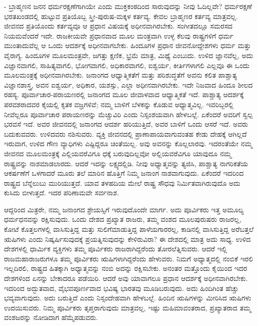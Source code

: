 - ಬ್ರಾಹ್ಮಣನ ಜನನ ಧರ್ಮರಕ್ಷಣೆಗಾಗಿಯೇ ಎಂದು ಮುಕ್ತಕಂಠದಿಂದ ಸಾರುವುದನ್ನು ನೀವು ಓದಿಲ್ಲವೇ? ಧರ್ಮರಕ್ಷಣೆ ಭರತಖಂಡದಲ್ಲಿ ಹುಟ್ಟುವ ಪ್ರತಿಯೊಬ್ಬ ಸ್ತ್ರೀ-ಪುರುಷ-ಮಕ್ಕಳ ಕರ್ತವ್ಯ. ಕೇವಲ ಬ್ರಾಹ್ಮಣರ ಕರ್ತವ್ಯ ಮಾತ್ರವಲ್ಲ. ಜೀವನದ ಪ್ರತಿಯೊಂದು ಕರ್ತವ್ಯವೂ ಆ ಪ್ರಧಾನ ವಿಷಯಕ್ಕೆ ಅಧೀನವಾಗಿರಬೇಕು. ಸಂಗೀತದಲ್ಲೂ ಸಮರಸದ ನಿಯಮವೆಂದರೆ ಇದೇ. ರಾಜಕೀಯವೇ ಪ್ರಧಾನವಾದ ಮೂಲ ಮಂತ್ರವಾಗಿ ಉಳ್ಳ ಕೆಲವು ರಾಷ್ಟ್ರಗಳಿಗೆ ಧರ್ಮ ಮುಂತಾದುವೆಲ್ಲ ಆ ಒಂದು ಆದರ್ಶಕ್ಕೆ ಅಧೀನವಾಗಬೇಕು. ಹಿಂದೂಗಳ ಪ್ರಧಾನ ಜೀವನೋದ್ದೇಶಗಳು ಧರ್ಮ ಮತ್ತು ವೈರಾಗ್ಯ. ಹಿಂದೂಗಳ ಮೂಲಮಂತ್ರವೇ, ಜಗತ್ತು ಕ್ಷಣಿಕ, ಭ್ರಮೆ ಮಾತ್ರ, ಮಿಥ್ಯೆ ಎಂಬುದು. ಉಳಿದ ಜ್ಞಾನವೆಲ್ಲ, ಅದು ವಿಜ್ಞಾನವಾಗಲಿ, ಸಾಹಿತ್ಯವಾಗಲಿ, ಭೋಗವಾಗಲಿ, ಅಧಿಕಾರವಾಗಲಿ, ಐಶ್ವರ್ಯ, ಕೀರ್ತಿಗಳಾಗಲಿ ಎಲ್ಲವೂ ಈ ಒಂದು ಮೂಲಮಂತ್ರಕ್ಕೆ ಅಧೀನವಾಗಿರಬೇಕು. ಜನಾಂಗದ ಆಧ್ಯಾತ್ಮಿಕತೆಗೆ ಮತ್ತು ಪರಿಶುದ್ಧತೆಗೆ ಅವನು ಕಲಿತ ಪಾಶ್ಚಾತ್ಯ ವಿಜ್ಞಾನಶಾಸ್ತ್ರ, ಅವನ ಐಶ್ವರ್ಯ, ಅಧಿಕಾರ, ಯಶಸ್ಸು, ಎಲ್ಲಾ ಅಧೀನವಾಗಿರಬೇಕು. ಇದೇ ನಿಜವಾದ ಹಿಂದೂ ಶೀಲದ ರಹಸ್ಯ. ಪೂರ್ವಾಚಾರ-ಪರಾಯಣರಲ್ಲಿ ಜನಾಂಗದ ಮೂಲ ಜೀವಾಳವಾದ ಆಧ್ಯಾತ್ಮಿಕತೆ ಇದೆ. ಪಾಶ್ಚಾತ್ಯ ಆದರ್ಶಕ್ಕೆ ಪರವಶರಾದವರ ಕೈಯಲ್ಲಿ ಕೃತಕ ವಜ್ರಗಳಿವೆ; ನಮ್ಮ ಬಾಳಿಗೆ ಬೆಳಕನ್ನು ಕೊಡುವ ಅಧ್ಯಾತ್ಮವಿಲ್ಲ. ಇವರಿಬ್ಬರಲ್ಲಿ ನೀವೆಲ್ಲರೂ ಪೂರ್ವಾಚಾರ ಪರಾಯಣರನ್ನು ಮೆಚ್ಚುವಿರಿ ಎಂದು ನಿಸ್ಸಂಶಯವಾಗಿ ಹೇಳಬಲ್ಲೆ. ಏಕೆಂದರೆ ಅವರಿಗೆ ಸ್ವಲ್ಪ ಭರವಸೆ ಇದೆ. ಅವರ ಜೀವನದಲ್ಲಿ ಜನಾಂಗದ ಆದರ್ಶ ಹರಿಯುತ್ತಿದೆ, ಅವರ ಬಾಳಿಗೆ ಒಂದು ಆಸರೆ ಇದೆ. ಅವರು ಬದುಕುವವರು. ಉಳಿದವರು ನಶಿಸುವರು. ವ್ಯಕ್ತಿ ಜೀವನದಲ್ಲಿ ಪ್ರಾಣಾಪಾಯವಾಗುವಂತಹ ಕೇಡು ದೇಹಕ್ಕೆ ಆಗಿಲ್ಲದೆ ಇರುವಾಗ, ಉಳಿದ ಗೌಣ ವ್ಯಾಧಿಗಳು ಎಷ್ಟಿದ್ದರೂ ಚಿಂತೆಯಿಲ್ಲ. ಅವು ಅವನನ್ನು ಕೊಲ್ಲಲಾರವು. ಇದರಂತೆಯೇ ನಮ್ಮ ಜೀವನದ ಮೂಲಮಂತ್ರಕ್ಕೆ ಎಲ್ಲಿಯವರೆವಿಗೂ ಧಕ್ಕೆ ಬರುವುದಿಲ್ಲವೋ ಅಲ್ಲಿಯವರೆವಿಗೂ ಯಾವುದೂ ನಮ್ಮ ರಾಷ್ಟ್ರವನ್ನು ನಾಶಮಾಡಲಾರದು. ಆದರೆ ಇದನ್ನು ಲಕ್ಷ್ಯದಲ್ಲಿಡಿ. ನೀವು ಅಧ್ಯಾತ್ಮವನ್ನು ತ್ಯಜಿಸಿ, ಪಾಶ್ಚಾತ್ಯ ನಾಗರಿಕತೆಯ ಆಕರ್ಷಣೆಗೆ ಒಳಗಾದರೆ ಮೂರು ತಲೆ ಮಾರಿನ ಹೊತ್ತಿಗೆ ನಿಮ್ಮ ಜನಾಂಗ ನಾಶವಾಗುವುದು. ಏಕೆಂದರೆ ಇದರಿಂದ ರಾಷ್ಟ್ರದ ಬೆನ್ನೆಲುಬು ಮುರಿಯುತ್ತದೆ. ಯಾವ ತಳಹದಿಯ ಮೇಲೆ ರಾಷ್ಟ್ರ ಸೌಧವು ನಿರ್ಮಿತವಾಗಿರುವುದೊ ಅದು ಕುಸಿದು ಬೀಳುತ್ತದೆ. ಇದರ ಪರಿಣಾಮವೇ ಸರ್ವನಾಶ.

ಆದ್ದರಿಂದ ಮಿತ್ರರೇ, ನಮ್ಮ ಜನಾಂಗದ ಶ್ರೇಯಸ್ಸಿಗೆ ಇರುವುದೊಂದೇ ಮಾರ್ಗ. ಅದು ಪೂರ್ವಿಕರು ಇತ್ತ ಅಮೂಲ್ಯ ಧರ್ಮಧನವನ್ನು ರಕ್ಷಿಸುವುದು. ಒಂದು ದೇಶದ ಪ್ರಖ್ಯಾತ ರಾಜರು, ತಮ್ಮ ವಂಶದ ಮೂಲಪುರುಷರು ರಾಜರಲ್ಲ, ಕೋಟೆ ಕೊತ್ತಲಗಳಲ್ಲಿ ವಾಸಿಸುತ್ತಿದ್ದ ಮತ್ತು ಸುಲಿಗೆಮಾಡುತ್ತಿದ್ದ ಪಾಳೆಯಗಾರರಲ್ಲ, ಕಾಡಿನಲ್ಲಿ ವಾಸಿಸುತ್ತಿದ್ದ ಅರೆಬತ್ತಲೆ ಋಷಿಗಳು ಎಂದು ನಿಷ್ಕರ್ಷಿಸುವುದಕ್ಕೆ ಪ್ರಯತ್ನಿಸುವುದನ್ನು ಕೇಳಿರುವಿರಾ? ಈ ದೇಶದಲ್ಲಿ ಮಾತ್ರ ಅದು ಸಾಧ್ಯ. ಉಳಿದ ದೇಶಗಳಲ್ಲಿ ಧಾರ್ಮಿಕ ವ್ಯಕ್ತಿಗಳು ತಮ್ಮ ಪೂರ್ವಿಕರು ರಾಜರಾಗಿದ್ದರೆಂದು ತೋರಲೆತ್ನಿಸುವರು. ಆದರೆ ಇಲ್ಲಿ ರಾಜಮಹಾರಾಜರುಗಳೂ ತಮ್ಮ ಪೂರ್ವಿಕರು ಋಷಿಗಳಾಗಿದ್ದರೆಂದು ಹೇಳುವರು. ನಿಮಗೆ ಅಧ್ಯಾತ್ಮದಲ್ಲಿ ನಂಬಿಕೆ ಇರಲಿ ಇಲ್ಲದಿರಲಿ, ರಾಷ್ಟ್ರದ ಹಿತಕ್ಕಾಗಿ ಅಧ್ಯಾತ್ಮವನ್ನು ನಂಬಿ ಅದನ್ನು ರಕ್ಷಿಸಬೇಕು. ಅನಂತರ ಮತ್ತೊಂದು ಕೈಯಿಂದ ಇದರ ದೇಶಗಳಿಂದ ಏನನ್ನು ಬೇಕಾದರೂ ಪಡೆಯಿರಿ. ಆದರೆ ಅವು ಯಾವಾಗಲೂ ಪ್ರಧಾನ ಆದರ್ಶಕ್ಕೆ ಅಧೀನವಾಗಿರಬೇಕು. ಇದರಿಂದ ಅದ್ಭುತವಾದ, ವೈಭವಪೂರ್ಣವಾದ ಭವಿಷ್ಯ ಭಾರತವು ಮೂಡಿಬರುವುದು. ಅದು ಹಿಂದಿಗಿಂತ ಹೆಚ್ಚು ಭವ್ಯವಾಗುವುದು. ಅದು ಬರುತ್ತಿದೆ ಎಂದು ನಿಸ್ಸಂದೇಹವಾಗಿ ಹೇಳಬಲ್ಲೆ. ಹಿಂದಿನ ಋಷಿಗಳನ್ನು ಮೀರಿಸಿದ ಋಷಿಗಳು ಉದಯಿಸುವರು. ನಿಮ್ಮ ಪೂರ್ವಿಕರು ತೃಪ್ತರಾಗುವುದು ಮಾತ್ರವಲ್ಲ, ಇಷ್ಟು ಮಹಿಮಾವಂತರಾದ, ಪ್ರಖ್ಯಾತರಾದ ತಮ್ಮ ವಂಶಜರನ್ನು ನೋಡಿದಾಗ ಹೆಮ್ಮೆಪಡುವರು.

